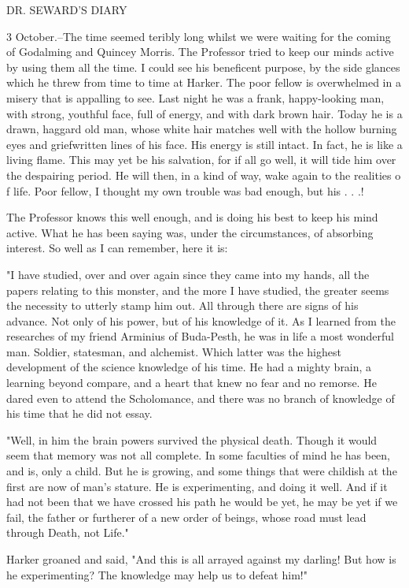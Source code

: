 DR. SEWARD'S DIARY 

3 October.--The time seemed teribly long whilst we were waiting for the coming of Godalming and Quincey Morris. The Professor tried to keep our minds active by using them all the time. I could see his beneficent purpose, by the side glances which he threw from time to time at Harker. The poor fellow is overwhelmed in a misery that is appalling to see. Last night he was a frank, happy-looking man, with strong, youthful face, full of energy, and with dark brown hair. Today he is a drawn, haggard old man, whose white hair matches well with the hollow burning eyes and griefwritten lines of his face. His energy is still intact. In fact, he is like a living flame. This may yet be his salvation, for if all go well, it will tide him over the despairing period. He will then, in a kind of way, wake again to the realities o f life. Poor fellow, I thought my own trouble was bad enough, but his . . .! 

The Professor knows this well enough, and is doing his best to keep his mind active. What he has been saying was, under the circumstances, of absorbing interest. So well as I can remember, here it is: 

"I have studied, over and over again since they came into my hands, all the papers relating to this monster, and the more I have studied, the greater seems the necessity to utterly stamp him out. All through there are signs of his advance. Not only of his power, but of his knowledge of it. As I learned from the researches of my friend Arminius of Buda-Pesth, he was in life a most wonderful man. Soldier, statesman, and alchemist. Which latter was the highest development of the science knowledge of his time. He had a mighty brain, a learning beyond compare, and a heart that knew no fear and no remorse. He dared even to attend the Scholomance, and there was no branch of knowledge of his time that he did not essay. 

"Well, in him the brain powers survived the physical death. Though it would seem that memory was not all complete. In some faculties of mind he has been, and is, only a child. But he is growing, and some things that were childish at the first are now of man's stature. He is experimenting, and doing it well. And if it had not been that we have crossed his path he would be yet, he may be yet if we fail, the father or furtherer of a new order of beings, whose road must lead through Death, not Life." 

Harker groaned and said, "And this is all arrayed against my darling! But how is he experimenting? The knowledge may help us to defeat him!" 

